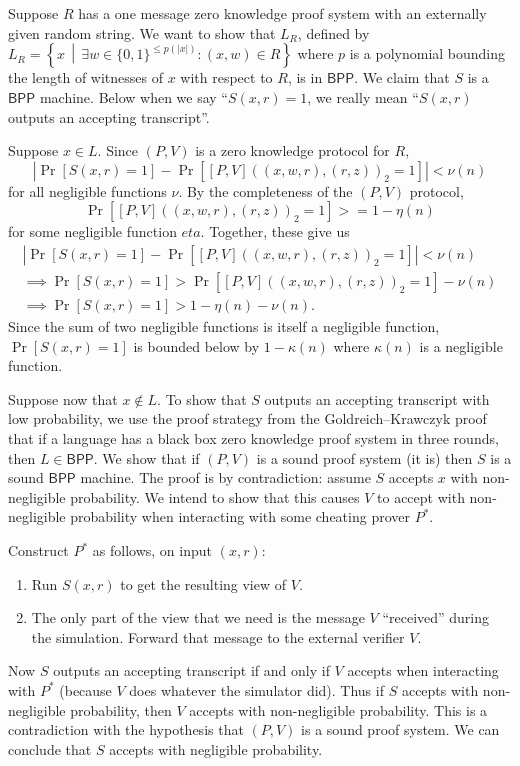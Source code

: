 \documentclass{article}
\newcommand{\class}[1]{{\ensuremath{\mathsf{#1}}}}
\newcommand{\BPP}{\class{BPP}}
\begin{document}
\begin{enumerate}
  Suppose $R$ has a one message zero knowledge proof system with an externally given random string.
  We want to show that $L_R$, defined by $L_R=\left\{ x \,\middle|\, \exists w\in\{0, 1\}^{\leq p(|x|)}\colon (x, w)\in R \right\}$ where $p$ is a polynomial bounding the length of witnesses of $x$ with respect to $R$, is in $\BPP$.
  We claim that $S$ is a $\BPP$ machine.
  Below when we say ``$S(x, r)=1$, we really mean ``$S(x, r)$ outputs an accepting transcript''.

  Suppose $x\in L$.
  Since $(P, V)$ is a zero knowledge protocol for $R$,
  \begin{displaymath}
    \left|\Pr\left[S(x,r)=1\right] - \Pr\left[[P,V]((x, w, r), (r, z))_2=1\right]\right| < \nu(n)
  \end{displaymath}
  for all negligible functions $\nu$.
  By the completeness of the $(P, V)$ protocol,
  \begin{displaymath}
    \Pr\left[[P, V]((x, w, r), (r, z))_2 = 1\right] >= 1 - \eta(n)
  \end{displaymath}
  for some negligible function $eta$.
  Together, these give us
  \begin{align*}
    \left|\Pr\left[S(x,r)=1\right] - \Pr\left[[P,V]((x, w, r), (r, z))_2=1\right]\right| < \nu(n) \\
    \implies \Pr\left[S(x,r)=1\right] > \Pr\left[[P,V]((x, w, r), (r, z))_2=1\right] - \nu(n) \\
    \implies \Pr\left[S(x,r)=1\right] > 1 - \eta(n) - \nu(n).
  \end{align*}
  Since the sum of two negligible functions is itself a negligible function, $\Pr[S(x,r)=1]$ is bounded below by $1-\kappa(n)$ where $\kappa(n)$ is a negligible function.

  Suppose now that $x\notin L$.
  To show that $S$ outputs an accepting transcript with low probability, we use the proof strategy from the Goldreich--Krawczyk proof that if a language has a black box zero knowledge proof system in three rounds, then $L\in\BPP$.
  We show that if $(P, V)$ is a sound proof system (it is) then $S$ is a sound $\BPP$ machine.
  The proof is by contradiction: assume $S$ accepts $x$ with non-negligible probability.
  We intend to show that this causes $V$ to accept with non-negligible probability when interacting with some cheating prover $P^*$.

  Construct $P^*$ as follows, on input $(x, r)$:
  \begin{enumerate}
  \item Run $S(x, r)$ to get the resulting view of $V$.
  \item
    The only part of the view that we need is the message $V$ ``received'' during the simulation.
    Forward that message to the external verifier $V$.
  \end{enumerate}
  Now $S$ outputs an accepting transcript if and only if $V$ accepts when interacting with $P^*$ (because $V$ does whatever the simulator did).
  Thus if $S$ accepts with non-negligible probability, then $V$ accepts with non-negligible probability.
  This is a contradiction with the hypothesis that $(P, V)$ is a sound proof system.
  We can conclude that $S$ accepts with negligible probability.


\end{enumerate}
\end{document}
